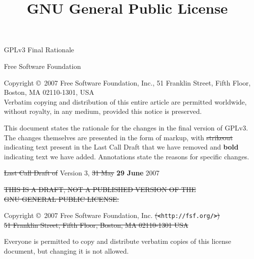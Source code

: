 \documentclass[11pt]{article}
\title{GNU General Public License}
\date{}
\newcommand\dblnew{\newpage \mbox\\ \newpage}
\newcounter{v2section}
\newcounter{v3section}
\begin{document}
\thispagestyle{empty}

\begin{center}
\huge{GPLv3 Final Rationale}
\end{center}

\begin{center}
\Large{Free Software Foundation}
\end{center}

\vspace{300pt}
\noindent
Copyright \copyright\ 2007 Free Software Foundation, Inc., 51 Franklin Street,
Fifth Floor, Boston, MA 02110-1301, USA\\ 

\noindent
Verbatim copying and distribution of this entire article are permitted
worldwide, without royalty, in any medium, provided this notice is
preserved.


\dblnew

This document states the rationale for the changes in the final version
of GPLv3.  The changes themselves are presented in the form of markup,
with \sout{strikeout} indicating text present in the Last Call Draft
that we have removed and \textbf{bold} indicating text we have added.
Annotations state the reasons for specific changes.
 
\dblnew

\sectionfont{\normalfont}
\subsectionfont{\normalfont}

\maketitle

\vspace{-.6in}

\begin{center}
{\parindent 0in

\sout{Last Call Draft of} Version 3, \sout{31 May} \textbf{29 June} 2007

\bigskip

\sout{THIS IS A DRAFT, NOT A PUBLISHED VERSION OF THE \\ GNU GENERAL PUBLIC
LICENSE.} 

\bigskip

 Copyright \copyright\ 2007 Free Software Foundation,
 Inc. \sout{(}\texttt{\textbf{<}http://fsf.org\/\textbf{/>}}\sout{)}
 \\ \sout{51 Franklin Street, Fifth Floor, Boston, MA 02110-1301 USA}}
\end{center}

 \noindent
 Everyone is permitted to copy and distribute verbatim copies of this
 license document, but changing it is not allowed.
\end{document}
